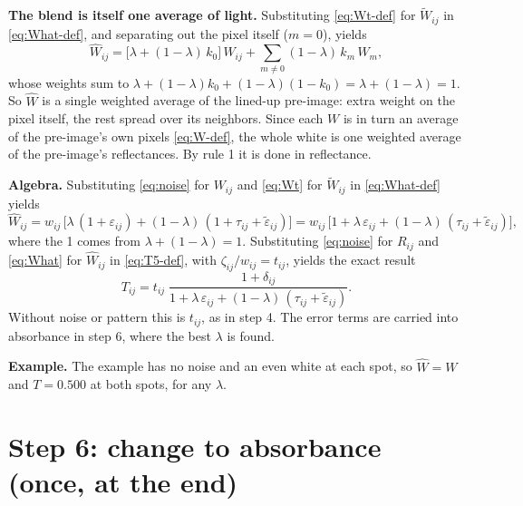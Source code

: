 \documentclass[11pt,letter]{article}
\begin{document}
\textbf{The blend is itself one average of light.}  Substituting
\eqref{eq:Wt-def} for $\widetilde W_{ij}$ in \eqref{eq:What-def}, and
separating out the pixel itself ($m = 0$), yields
\begin{equation}
  \widehat W_{ij} = \bigl[\lambda + (1 - \lambda)\, k_0\bigr]\, W_{ij}
    + \sum_{m \ne 0} (1 - \lambda)\, k_m\, W_m ,
  \label{eq:What-weights}
\end{equation}
whose weights sum to
$\lambda + (1-\lambda)k_0 + (1-\lambda)(1 - k_0) = \lambda + (1-\lambda) = 1$.
So $\widehat W$ is a single weighted average of the lined-up pre-image:
extra weight on the pixel itself, the rest spread over its neighbors.
Since each $W$ is in turn an average of the pre-image's own pixels
\eqref{eq:W-def}, the whole white is one weighted average of the
pre-image's reflectances.  By rule 1 it is done in reflectance.

\textbf{Algebra.}  Substituting \eqref{eq:noise} for $W_{ij}$ and
\eqref{eq:Wt} for $\widetilde W_{ij}$ in \eqref{eq:What-def} yields
\begin{equation}
  \widehat W_{ij} = w_{ij}\,\bigl[\lambda\,(1 + \varepsilon_{ij})
    + (1 - \lambda)\,(1 + \tau_{ij} + \widetilde\varepsilon_{ij})\bigr]
  = w_{ij}\,\bigl[1 + \lambda\,\varepsilon_{ij}
    + (1 - \lambda)\,(\tau_{ij} + \widetilde\varepsilon_{ij})\bigr],
  \label{eq:What}
\end{equation}
where the 1 comes from $\lambda + (1 - \lambda) = 1$.  Substituting
\eqref{eq:noise} for $R_{ij}$ and \eqref{eq:What} for $\widehat W_{ij}$ in
\eqref{eq:T5-def}, with $\zeta_{ij}/w_{ij} = t_{ij}$, yields the exact result
\begin{equation}
  T_{ij} = t_{ij}\;
    \frac{1 + \delta_{ij}}
         {1 + \lambda\,\varepsilon_{ij}
            + (1 - \lambda)\,(\tau_{ij} + \widetilde\varepsilon_{ij})} .
  \label{eq:T5}
\end{equation}
Without noise or pattern this is $t_{ij}$, as in step 4.  The error terms
are carried into absorbance in step 6, where the best $\lambda$ is found.

\textbf{Example.}  The example has no noise and an even white at each spot,
so $\widehat W = W$ and $T = 0.500$ at both spots, for any $\lambda$.

\section{Step 6: change to absorbance (once, at the end)}
\label{sec:absorbance}
\end{document}

